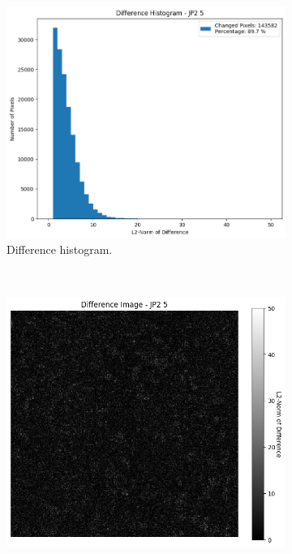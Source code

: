 \begin{figure}[htb]
\begin{subfigure}[b]{0.48\textwidth}
        \includegraphics[width=\textwidth]{doc/thesis/0_figures/compare_quality/set1/jp2_5_center_diff_histogram.png}
        \caption{Difference histogram.}
        \label{fig:img_quality_comp_jp2_5_center_histo}
    \end{subfigure}
    \\
    \begin{subfigure}[b]{0.48\textwidth}
        \centering
        \includegraphics[width=\textwidth]{doc/thesis/0_figures/compare_quality/set1/jp2_5_center_diff_heatmap.png}

\end{subfigure}
\end{figure}
